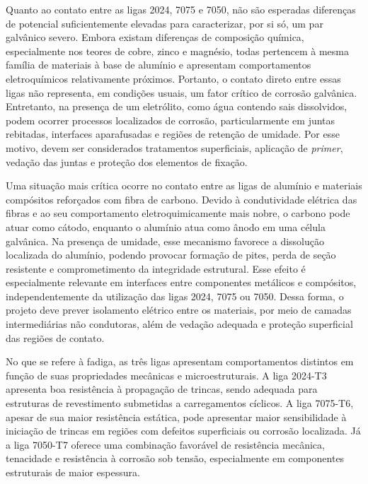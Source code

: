 Quanto ao contato entre as ligas 2024, 7075 e 7050, não são esperadas diferenças de potencial suficientemente elevadas para caracterizar, por si só, um par galvânico severo. Embora existam diferenças de composição química, especialmente nos teores de cobre, zinco e magnésio, todas pertencem à mesma família de materiais à base de alumínio e apresentam comportamentos eletroquímicos relativamente próximos. Portanto, o contato direto entre essas ligas não representa, em condições usuais, um fator crítico de corrosão galvânica. Entretanto, na presença de um eletrólito, como água contendo sais dissolvidos, podem ocorrer processos localizados de corrosão, particularmente em juntas rebitadas, interfaces aparafusadas e regiões de retenção de umidade. Por esse motivo, devem ser considerados tratamentos superficiais, aplicação de \textit{primer}, vedação das juntas e proteção dos elementos de fixação.

Uma situação mais crítica ocorre no contato entre as ligas de alumínio e materiais compósitos reforçados com fibra de carbono. Devido à condutividade elétrica das fibras e ao seu comportamento eletroquimicamente mais nobre, o carbono pode atuar como cátodo, enquanto o alumínio atua como ânodo em uma célula galvânica. Na presença de umidade, esse mecanismo favorece a dissolução localizada do alumínio, podendo provocar formação de pites, perda de seção resistente e comprometimento da integridade estrutural. Esse efeito é especialmente relevante em interfaces entre componentes metálicos e compósitos, independentemente da utilização das ligas 2024, 7075 ou 7050. Dessa forma, o projeto deve prever isolamento elétrico entre os materiais, por meio de camadas intermediárias não condutoras, além de vedação adequada e proteção superficial das regiões de contato.

No que se refere à fadiga, as três ligas apresentam comportamentos distintos em função de suas propriedades mecânicas e microestruturais. A liga 2024-T3 apresenta boa resistência à propagação de trincas, sendo adequada para estruturas de revestimento submetidas a carregamentos cíclicos. A liga 7075-T6, apesar de sua maior resistência estática, pode apresentar maior sensibilidade à iniciação de trincas em regiões com defeitos superficiais ou corrosão localizada. Já a liga 7050-T7 oferece uma combinação favorável de resistência mecânica, tenacidade e resistência à corrosão sob tensão, especialmente em componentes estruturais de maior espessura.

